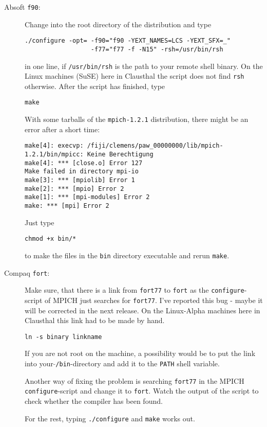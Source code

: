 \documentclass[a4paper,10pt]{article}
\begin{document}
\begin{description}
\item[Absoft \texttt{f90}:] Change into the root directory of the distribution and type
\begin{verbatim}
./configure -opt= -f90="f90 -YEXT_NAMES=LCS -YEXT_SFX=_" 
                  -f77="f77 -f -N15" -rsh=/usr/bin/rsh 
\end{verbatim}
in one line, if \texttt{/usr/bin/rsh} is the path to your remote shell binary.  On the Linux machines (SuSE) here in Clausthal the script does not find \texttt{rsh} otherwise.  After the script has finished, type 
\begin{verbatim}
make
\end{verbatim}
 With some tarballs of the \texttt{mpich-1.2.1} distribution,
there might be an error after a short time: {\footnotesize
\begin{verbatim}
make[4]: execvp: /fiji/clemens/paw_00000000/lib/mpich-1.2.1/bin/mpicc: Keine Berechtigung
make[4]: *** [close.o] Error 127
Make failed in directory mpi-io
make[3]: *** [mpiolib] Error 1
make[2]: *** [mpio] Error 2
make[1]: *** [mpi-modules] Error 2
make: *** [mpi] Error 2
\end{verbatim}
}
Just type
\begin{verbatim}
chmod +x bin/*
\end{verbatim}
to make the files in the \texttt{bin} directory executable and rerun \texttt{make}.
\item[Compaq \texttt{fort}:] Make sure, that there is a link from \texttt{fort77} to \texttt{fort} as the \texttt{configure}-script of MPICH just searches for \texttt{fort77}.  I've reported this bug - maybe it will be corrected in the next release.  On the Linux-Alpha machines here in Clausthal this link had to be made by hand.  
\begin{verbatim}
ln -s binary linkname
\end{verbatim}
If you are not root on the machine, a possibility would be to put the link into
 your \texttt{$\tilde{}$/bin}-directory and add it to the \texttt{PATH} shell variable.  

Another way of fixing the problem is searching \texttt{fort77} in the MPICH
\texttt{configure}-script and change it to \texttt{fort}.  Watch the output of
the script to check whether the compiler has been found.

For the rest, typing \texttt{./configure} and \texttt{make} works out.

\end{description}
\end{document}
